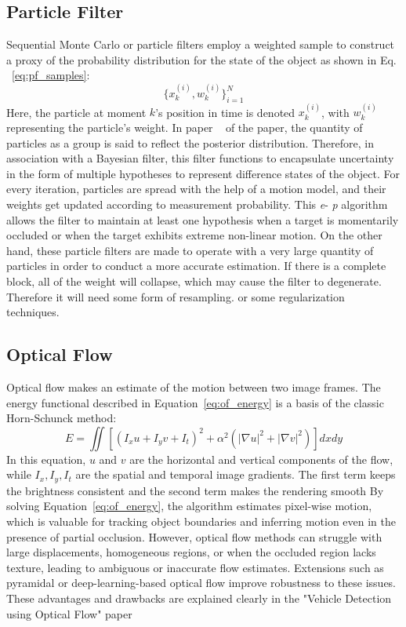 \documentclass[12pt,a4paper]{report}
\theoremstyle{definition}
\theoremstyle{remark}
\begin{document}
\subsection{Particle Filter}
Sequential Monte Carlo or particle filters employ a weighted sample to construct a proxy of the probability distribution for the state of the object as shown in Eq. ~\ref{eq:pf_samples}:
\begin{equation}
\label{eq:pf_samples}
\{x_k^{(i)}, w_k^{(i)}\}_{i=1}^N
\end{equation}
Here, the particle at moment $k$'s position in time is denoted $x_k^{(i)}$, with $w_k^{(i)}$ representing the particle's weight. In paper ~\cite{39} of the paper, the quantity of particles as a group is said to reflect the posterior distribution. Therefore, in association with a Bayesian filter, this filter functions to encapsulate uncertainty in the form of multiple hypotheses to represent difference states of the object. For every iteration, particles are spread with the help of a motion model, and their weights get updated according to measurement probability. This \textit{e}- \textit{p} algorithm allows the filter to maintain at least one hypothesis when a target is momentarily occluded or when the target exhibits extreme non-linear motion. On the other hand, these particle filters are made to operate with a very large quantity of particles in order to conduct a more accurate estimation. If there is a complete block, all of the weight will collapse, which may cause the filter to degenerate. Therefore it will need some form of resampling. or some regularization techniques.

\subsection{Optical Flow}
Optical flow makes an estimate of the motion between two image frames. The energy functional described in Equation~\ref{eq:of_energy} is a basis of the classic Horn-Schunck method:
\begin{equation}
\label{eq:of_energy}
E = \iint \left[ (I_x u + I_y v + I_t)^2 + \alpha^2 (|\nabla u|^2 + |\nabla v|^2) \right] dx dy
\end{equation}
In this equation, $u$ and $v$ are the horizontal and vertical components of the flow, while $I_x, I_y, I_t$ are the spatial and temporal image gradients. The first term keeps the brightness consistent and the second term makes the rendering smooth By solving Equation~\ref{eq:of_energy}, the algorithm estimates pixel-wise motion, which is valuable for tracking object boundaries and inferring motion even in the presence of partial occlusion. However, optical flow methods can struggle with large displacements, homogeneous regions, or when the occluded region lacks texture, leading to ambiguous or inaccurate flow estimates. Extensions such as pyramidal or deep-learning-based optical flow improve robustness to these issues. These advantages and drawbacks are explained clearly in the "Vehicle Detection using Optical Flow" paper ~\cite{paper48}
\end{document}

